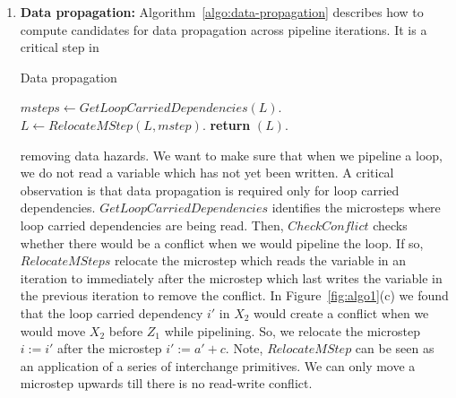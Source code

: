 \begin{enumerate}
\item {\bf Data propagation:} Algorithm~\ref{algo:data-propagation} describes how to compute candidates for data propagation across pipeline iterations. It is a critical step in 


\begin{algorithm}
\caption{Data propagation} \label{algo:data-propagation}
\begin{algorithmic}[1]
\State $msteps \leftarrow GetLoopCarriedDependencies(L)$.
\State $L \leftarrow RelocateMStep (L, mstep)$.
\EndIf
\EndFor
\State \textbf{return} $(L)$.
\EndProcedure
\end{algorithmic}
\end{algorithm}

removing data hazards. We want to make sure that when we pipeline a loop, we do not read a variable which has not yet been written. A critical observation is that data propagation is required only for loop carried dependencies.
$GetLoopCarriedDependencies$ identifies the microsteps where loop carried dependencies are being read. Then, $CheckConflict$ checks whether there would be a conflict when we would pipeline the loop. 
If so, $RelocateMSteps$ relocate the microstep which reads the variable in an iteration to immediately after the microstep which last writes the variable in the previous iteration to remove the conflict. In Figure~\ref{fig:algo1}(c) we found that the loop carried dependency $i'$ in $X_2$ would create a conflict when we would move $X_2$ before $Z_1$ while pipelining. So, we relocate the microstep $i := i'$ after the microstep $i' := a' + c$. Note, $RelocateMStep$ can be seen as an application of a series of interchange primitives. We can only move a microstep upwards till there is no read-write conflict. 


\end{enumerate}
